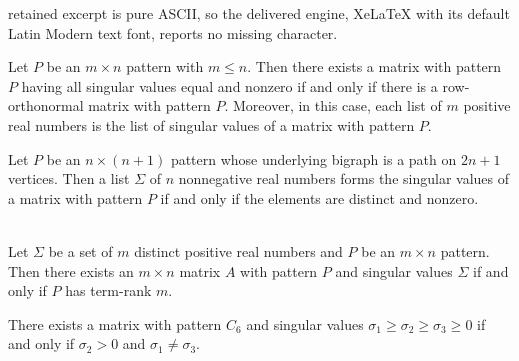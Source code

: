 \documentclass[10pt,a4paper]{amsart}
\begin{document}
retained excerpt is pure ASCII, so the delivered engine, XeLaTeX with its default Latin Modern text font, reports no missing character.
\begin{theorem}
\label{ortho}
Let $P$ be an $m\times n$ pattern with $m\leq n$.
Then there exists a matrix with pattern $P$ having 
all singular values equal and nonzero if and only if 
there is a row-orthonormal matrix with pattern $P$.
Moreover, in this case,   each list of $m$ positive real numbers is 
the list of singular values of a matrix with pattern $P$.
\end{theorem}

\begin{theorem}
\label{Path}
Let $P$ be an $n\times (n+1)$ pattern whose underlying bigraph is a path on $2n+1$ vertices.  Then a list $\Sigma$ of $n$ nonnegative real numbers forms the singular values of a matrix with pattern $P$ if and only if the elements are distinct and nonzero.
\end{theorem}

\begin{corollary}
\phantom{ }\\ 
\label{distinct}
Let $\Sigma$ be a set of $m$ distinct positive real numbers 
and $P$ be an $m\times n$ pattern. 
Then there exists an $m\times n$ matrix $A$ with pattern $P$
and singular values $\Sigma$ if and only if $P$ has term-rank $m$.
\end{corollary}

\begin{corollary}
There exists a matrix with pattern $C_6$ and singular values $\sigma_1\geq \sigma_2 \geq \sigma_3 \geq 0$ if and only 
if $\sigma_2>0$ and $\sigma_1 \neq  \sigma_3$.
\end{corollary}
\end{document}
